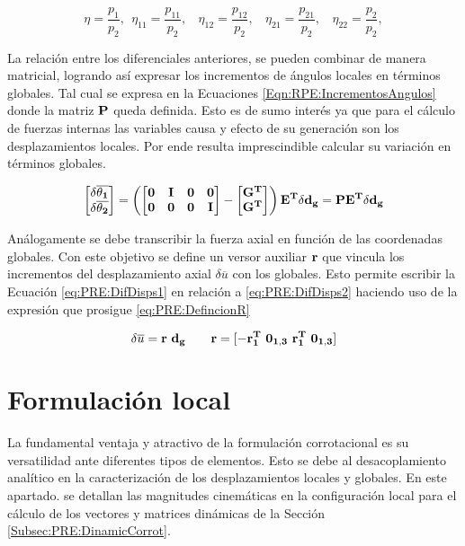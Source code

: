 \begin{equation}\label{Eqn:RPE:VectoresP}
	\eta = \frac{p_1}{p_2}, ~~\eta_{11} = \frac{p_{11}}{p_2}, ~~~~\eta_{12} = \frac{p_{12}}{p_2}, ~~~~\eta_{21} = \frac{p_{21}}{p_2}, ~~~~\eta_{22} = \frac{p_{2}}{p_2}, 
\end{equation}


La relación entre los diferenciales anteriores, se pueden combinar de manera matricial, logrando así expresar los incrementos de ángulos locales en términos globales. Tal cual se expresa en la Ecuaciones \eqref{Eqn:RPE:IncrementosAngulos} donde la matriz $\bf{P}$ queda definida. Esto es de sumo interés ya que para el cálculo de fuerzas internas las variables causa y efecto de su generación son los desplazamientos locales. Por ende resulta imprescindible calcular su variación en términos globales. 


\begin{equation}\label{Eqn:RPE:IncrementosAngulos}
	\begin{bmatrix}
		\bf{\delta\overline{\theta_1}}\\ 
		\bf{\delta\overline{\theta_2}}
	\end{bmatrix}=\left ( \begin{bmatrix}
		\bf{0} &\bf{I}  & \bf{0} &\bf{0} \\ 
		\bf{0}&\bf{0}  &\bf{0}  & \bf{I}
	\end{bmatrix}-\begin{bmatrix}
		\bf{G}^T\\ 
		\bf{G}^T
	\end{bmatrix} \right )\bf{E}^T \delta \bf{d_g}=\bf{P}\bf{E}^T \delta \bf{d_g}
\end{equation}

Análogamente se debe transcribir la fuerza axial en función de las coordenadas globales. Con este objetivo se define un versor auxiliar  $ \bf{r}$ que vincula los incrementos del desplazamiento axial $\delta \overline{u}$ con los globales. Esto permite escribir la Ecuación \eqref{eq:PRE:DifDisps1} en relación a  \eqref{eq:PRE:DifDisps2} haciendo uso de la expresión que prosigue \eqref{eq:PRE:DefincionR}

\begin{equation}\label{eq:PRE:DefincionR}
\delta \overline{u} = \bf{r}~ d_g ~~~~~~\bf{r} = [ -\bf{r}_1^T~ \bf{0}_{1,3}~ \bf{r}_1^T~ \bf{0}_{1,3}  ]
\end{equation}

\section{Formulación local}\label{Sec:PRE:LocalFormul}
La fundamental ventaja y atractivo de la formulación corrotacional es su versatilidad ante diferentes tipos de elementos. Esto se debe al desacoplamiento analítico en la caracterización de los desplazamientos locales y globales. En este apartado. se detallan las magnitudes cinemáticas en la configuración local para el cálculo de los vectores y matrices dinámicas de la Sección \ref{Subsec:PRE:DinamicCorrot}. 

